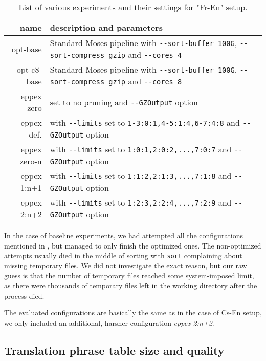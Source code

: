 \begin{table}[ht]
\centering
\begin{tabular}{ r p{10cm} }
name & description and parameters \\
\hline
\hline
opt-base      & Standard Moses pipeline with \verb|--sort-buffer 100G|, \verb|--sort-compress gzip| and \verb|--cores 4| \\
opt-c8-base   & Standard Moses pipeline with \verb|--sort-buffer 100G|, \verb|--sort-compress gzip| and \verb|--cores 8| \\
eppex zero    & \eppex{} set to no pruning and \verb|--GZOutput| option \\
eppex def.    & \eppex{} with \verb|--limits| set to \verb|1-3:0:1,4-5:1:4,6-7:4:8| and \verb|--GZOutput| option \\
eppex zero-n  & \eppex{} with \verb|--limits| set to \verb|1:0:1,2:0:2,...,7:0:7| and \verb|--GZOutput| option \\
eppex 1:n+1   & \eppex{} with \verb|--limits| set to \verb|1:1:2,2:1:3,...,7:1:8| and \verb|--GZOutput| option \\
eppex 2:n+2   & \eppex{} with \verb|--limits| set to \verb|1:2:3,2:2:4,...,7:2:9| and \verb|--GZOutput| option \\
\hline
\hline
\end{tabular}
\caption{\label{fr-en-80-scenarios}
List of various experiments and their settings for "Fr-En" setup.}
\end{table}

In the case of baseline experiments, we had attempted all the configurations mentioned
in , but managed to only finish the optimized ones.
The non-optimized attempts usually died in the middle of sorting with \texttt{sort} complaining
about missing temporary files.
We did not investigate the exact reason, but our raw guess is that the number of temporary
files reached some system-imposed limit, as there were thousands of temporary files left in
the working directory after the process died.

The evaluated \eppex{} configurations are basically the same as in the case of Cs-En setup,
we only included an additional, harsher configuration \emph{eppex 2:n+2}.

\subsection{Translation phrase table size and quality}

